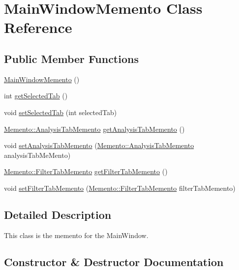 \hypertarget{classMemento_1_1MainWindowMemento}{}\section{Main\+Window\+Memento Class Reference}
\label{classMemento_1_1MainWindowMemento}
\subsection*{Public Member Functions}
\begin{DoxyCompactItemize}
\item 
\hyperlink{classMemento_1_1MainWindowMemento_a2ce9d23f57fc6397812a080c3111d56c}{Main\+Window\+Memento} ()
\item 
int \hyperlink{classMemento_1_1MainWindowMemento_a876003270f9665415d49783d0669511a}{get\+Selected\+Tab} ()
\item 
void \hyperlink{classMemento_1_1MainWindowMemento_a9ec6af835d6fdbf10eb8a6db5ad59578}{set\+Selected\+Tab} (int selected\+Tab)
\item 
\hyperlink{classMemento_1_1AnalysisTabMemento}{Memento\+::\+Analysis\+Tab\+Memento} \hyperlink{classMemento_1_1MainWindowMemento_aeaae363ca3c1aaa02d9acd9fbcd669e5}{get\+Analysis\+Tab\+Memento} ()
\item 
void \hyperlink{classMemento_1_1MainWindowMemento_a2f3cbb73b8364dfb6640b0e5225600cf}{set\+Analysis\+Tab\+Memento} (\hyperlink{classMemento_1_1AnalysisTabMemento}{Memento\+::\+Analysis\+Tab\+Memento} analysis\+Tab\+Me\+Mento)
\item 
\hyperlink{classMemento_1_1FilterTabMemento}{Memento\+::\+Filter\+Tab\+Memento} \hyperlink{classMemento_1_1MainWindowMemento_aca564eecb180bc19d899b14c9ebe5486}{get\+Filter\+Tab\+Memento} ()
\item 
void \hyperlink{classMemento_1_1MainWindowMemento_aabc5961524bfb567d2f7f5bdf79e6661}{set\+Filter\+Tab\+Memento} (\hyperlink{classMemento_1_1FilterTabMemento}{Memento\+::\+Filter\+Tab\+Memento} filter\+Tab\+Memento)
\end{DoxyCompactItemize}


\subsection{Detailed Description}
This class is the memento for the Main\+Window. 

\subsection{Constructor \& Destructor Documentation}
\hypertarget{classMemento_1_1MainWindowMemento_a2ce9d23f57fc6397812a080c3111d56c}{}
